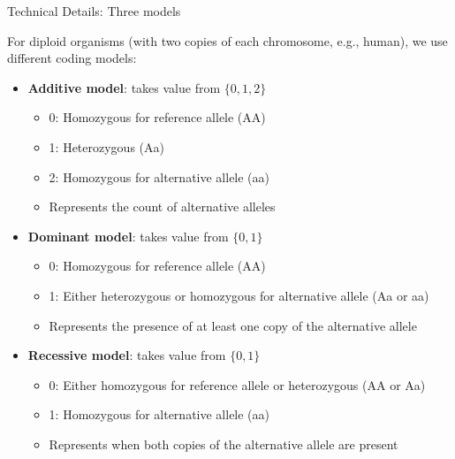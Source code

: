 \begin{frame}{Technical Details: Three models}

For diploid organisms (with two copies of each chromosome, e.g., human), we use different coding models:

\begin{itemize}
\item \textbf{Additive model}: takes value from $\{0, 1, 2\}$
\begin{itemize}
\item 0: Homozygous for reference allele (AA)
\item 1: Heterozygous (Aa)
\item 2: Homozygous for alternative allele (aa)
\item Represents the count of alternative alleles
\end{itemize}
\end{itemize}
   
\begin{itemize}
\item \textbf{Dominant model}: takes value from $\{0, 1\}$
\begin{itemize}
\item 0: Homozygous for reference allele (AA)
\item 1: Either heterozygous or homozygous for alternative allele (Aa or aa)
\item Represents the presence of at least one copy of the alternative allele
\end{itemize}
\end{itemize}
   
\begin{itemize}
\item \textbf{Recessive model}: takes value from $\{0, 1\}$
\begin{itemize}
\item 0: Either homozygous for reference allele or heterozygous (AA or Aa)
\item 1: Homozygous for alternative allele (aa)
\item Represents when both copies of the alternative allele are present
\end{itemize}
\end{itemize}

\end{frame}

